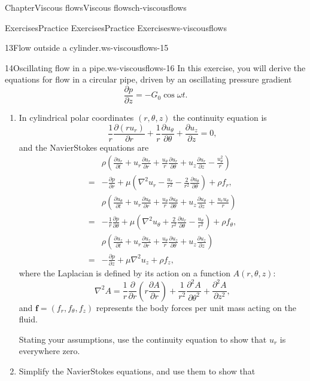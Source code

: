 \documentclass[oneside,10pt,]{book}
\numberwithin{equation}{section}
\newcommand{\pd}[2]{\frac{\partial#1}{\partial#2}}
\renewcommand{\bf}{\boldsymbol{f}}
\begin{document}
\begin{chapterptx}{Chapter}{Viscous flows}{}{Viscous flows}{}{}{ch-viscousflows}
\begin{exercises-section}{Exercises}{Practice Exercises}{}{Practice Exercises}{}{}{ws-viscousflows}
\begin{divisionexercise}{13}{Flow outside a cylinder.}{}{ws-viscousflows-15}
\begin{enumerate}[font=\bfseries,label=(\alph*),ref=\alph*]
\end{enumerate}%
\end{divisionexercise}%
\begin{divisionexercise}{14}{Oscillating flow in a pipe.}{}{ws-viscousflows-16}%
In this exercise, you will derive the equations for flow in a circular pipe, driven by an oscillating pressure gradient%
\begin{equation*}
\pd{p}{z}=-G_0\cos\omega t.
\end{equation*}
%
\begin{enumerate}[font=\bfseries,label=(\alph*),ref=\alph*]%
\item{}In cylindrical polar coordinates \((r,\theta,z)\) the continuity equation is%
\begin{equation*}
\frac1r\pd{(ru_r)}{r}+\frac1r\pd{u_\theta}{\theta}+\pd{u_z}{z}=0,
\end{equation*}
and the Navier\textendash{}Stokes equations are%
\begin{align*}
&\rho\left(\pd{u_r}{t}+u_r\pd{u_r}{r}+\frac{u_{\theta}}{r}\pd{u_r}{\theta}+u_z\pd{u_r}{z}-\frac{u_{\theta}^2}{r}\right)\\
=&-\pd{p}{r}
+\mu\left(\nabla^2u_r-\frac{u_r}{r^2}-\frac{2}{r^2}\pd{u_\theta}{\theta}\right)+\rho f_r,\\
&\rho\left(\pd{u_{\theta}}{t}+u_r\pd{u_{\theta}}{r}+\frac{u_{\theta}}{r}\pd{u_{\theta}}{\theta}+u_z\pd{u_{\theta}}{z}+\frac{u_ru_{\theta}}{r}\right)\\
=&-\frac{1}{r}\pd{p}{\theta}
+\mu\left(\nabla^2u_\theta+\frac{2}{r^2}\pd{u_r}{\theta}-\frac{u_{\theta}}{r^2}\right)+\rho f_{\theta},\\
&\rho\left(\pd{u_z}{t}+u_r\pd{u_z}{r}+\frac{u_{\theta}}{r}\pd{u_z}{\theta}+u_z\pd{u_z}{z}\right)\\
=&-\pd{p}{z}
+\mu\nabla^2u_z+\rho f_z,
\end{align*}
where the Laplacian is defined by its action on a function \(A(r,\theta,z)\):%
\begin{equation*}
\nabla^2A=\frac1r\pd{}{r}\left(r\pd{A}{r}\right)+\frac1{r^2}\pd{^2A}{\theta^2}+\pd{^2A}{z^2},
\end{equation*}
and \(\bf=(f_r,f_\theta,f_z)\) represents the body forces per unit mass acting on the fluid.%
\par
Stating your assumptions, use the continuity equation to show that \(u_r\) is everywhere zero.%
\item{}Simplify the Navier\textendash{}Stokes equations, and use them to show that%
\begin{equation*}

\end{equation*}
\end{enumerate}
\end{divisionexercise}
\end{exercises-section}
\end{chapterptx}
\end{document}
